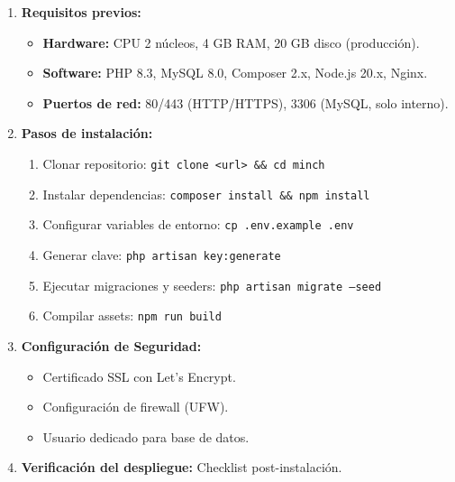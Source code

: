 \documentclass[stu]{apa7}
\begin{document}
\begin{enumerate}
    \item \textbf{Requisitos previos:}
    \begin{itemize}
        \item \textbf{Hardware:} CPU 2 núcleos, 4 GB RAM, 20 GB disco (producción).
        \item \textbf{Software:} PHP 8.3, MySQL 8.0, Composer 2.x, Node.js 20.x, Nginx.
        \item \textbf{Puertos de red:} 80/443 (HTTP/HTTPS), 3306 (MySQL, solo interno).
    \end{itemize}
    \item \textbf{Pasos de instalación:}
    \begin{enumerate}
        \item Clonar repositorio: \texttt{git clone <url> \&\& cd minch}
        \item Instalar dependencias: \texttt{composer install \&\& npm install}
        \item Configurar variables de entorno: \texttt{cp .env.example .env}
        \item Generar clave: \texttt{php artisan key:generate}
        \item Ejecutar migraciones y seeders: \texttt{php artisan migrate --seed}
        \item Compilar assets: \texttt{npm run build}
    \end{enumerate}
    \item \textbf{Configuración de Seguridad:}
    \begin{itemize}
        \item Certificado SSL con Let's Encrypt.
        \item Configuración de firewall (UFW).
        \item Usuario dedicado para base de datos.
    \end{itemize}
    \item \textbf{Verificación del despliegue:} Checklist post-instalación.
\end{enumerate}
\end{document}
